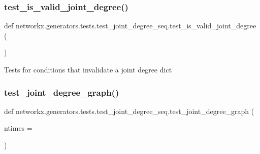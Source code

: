 \subsubsection{\texorpdfstring{test\+\_\+is\+\_\+valid\+\_\+joint\+\_\+degree()}{test\_is\_valid\_joint\_degree()}}
{\footnotesize\ttfamily def networkx.\+generators.\+tests.\+test\+\_\+joint\+\_\+degree\+\_\+seq.\+test\+\_\+is\+\_\+valid\+\_\+joint\+\_\+degree (\begin{DoxyParamCaption}{ }\end{DoxyParamCaption})}

\begin{DoxyVerb}Tests for conditions that invalidate a joint degree dict\end{DoxyVerb}
 \mbox{\label{namespacenetworkx_1_1generators_1_1tests_1_1test__joint__degree__seq_a848b60b78e3d63cec7cd6ebf849eb609}} 
\subsubsection{\texorpdfstring{test\+\_\+joint\+\_\+degree\+\_\+graph()}{test\_joint\_degree\_graph()}}
{\footnotesize\ttfamily def networkx.\+generators.\+tests.\+test\+\_\+joint\+\_\+degree\+\_\+seq.\+test\+\_\+joint\+\_\+degree\+\_\+graph (\begin{DoxyParamCaption}\item[{}]{ntimes = {} }\end{DoxyParamCaption})}

